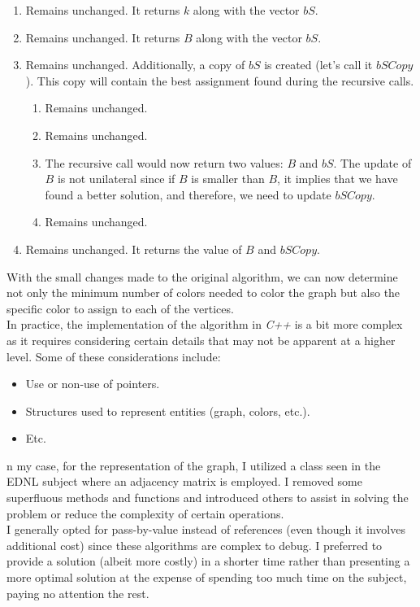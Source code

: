 \documentclass[british,a4paper,11pt,titlepage]{article}
\begin{document}
\begin{enumerate}
    \item Remains unchanged. It returns $k$ along with the vector $bS$.
    \item Remains unchanged. It returns $B$ along with the vector $bS$.
    \item Remains unchanged. Additionally, a copy of $bS$ is created (let's call it $bSCopy$). This copy will contain the best assignment found during the recursive calls.
    \begin{enumerate}
        \item Remains unchanged.
        \item Remains unchanged.
        \item The recursive call would now return two values: $B$ and $bS$. The update of $B$ is not unilateral since if $B$ is smaller than $B$, it implies that we have found a better solution, and therefore, we need to update $bSCopy$.
        \item Remains unchanged.
    \end{enumerate}
    \item Remains unchanged. It returns the value of $B$ and $bSCopy$.
\end{enumerate}

With the small changes made to the original algorithm, we can now determine not only the minimum number of colors needed to color the graph but also the specific color to assign to each of the vertices.
\\
In practice, the implementation of the algorithm in \emph{C++} is a bit more complex as it requires considering certain details that may not be apparent at a higher level. Some of these considerations include:

\begin{itemize}
    \item Use or non-use of pointers.
    \item Structures used to represent entities (graph, colors, etc.).
    \item Etc.
\end{itemize}

n my case, for the representation of the graph, I utilized a class seen in the EDNL subject where an adjacency matrix is employed. I removed some superfluous methods and functions and introduced others to assist in solving the problem or reduce the complexity of certain operations.
\\
I generally opted for pass-by-value instead of references (even though it involves additional cost) since these algorithms are complex to debug. I preferred to provide a solution (albeit more costly) in a shorter time rather than presenting a more optimal solution at the expense of spending too much time on the subject, paying no attention the rest.
\end{document}

